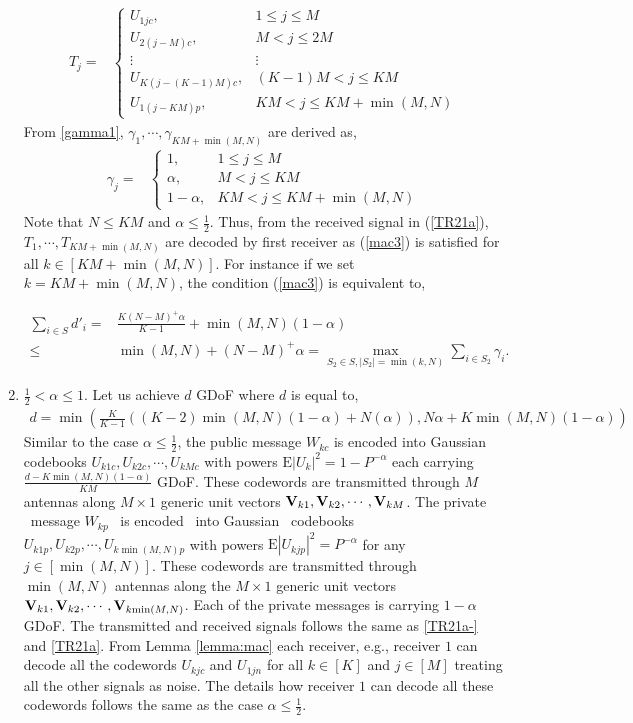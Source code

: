 \documentclass[11pt]{article}
\begin{document}
\begin{enumerate}
\begin {align}
T_j=&\left\{
\begin{array}{ll} 
U_{1jc},&1\le j\le {M}\\ 
U_{2(j-M)c},&M<j\le 2M\\
\vdots &\vdots\\
U_{K(j-(K-1)M)c},&(K-1)M<j\le KM\\
U_{1(j-KM)p},&KM<j\le KM+\min(M,N)
\end{array}
\right.
\end{align}
From \eqref{gamma1}, $\gamma_1,\cdots,\gamma_{KM+\min(M,N)}$ are derived as,
\begin {align}
\gamma_j=&\left\{
\begin{array}{ll} 
1,&1\le j\le M\\ 
\alpha,&M< j\le KM\\ 
1-\alpha,&KM< j\le KM+\min(M,N)
\end{array}
\right.\label{ffd2}
\end{align}
Note that $N\le KM$ and $\alpha\le\frac{1}{2}$. Thus, from the received signal in (\ref{TR21a}), $T_1,\cdots,T_{KM+\min(M,N)}$ are decoded by  first receiver as (\ref{mac3}) is satisfied for all $k\in[KM+\min(M,N)]$. For instance if we set $k=KM+\min(M,N)$, the condition (\ref{mac3}) is equivalent to,

\begin{align}
\sum_{i\in S} d'_i=&\frac{K(N-M)^+\alpha}{K-1}+\min(M,N)(1-\alpha)\nonumber\\
\le&\min(M,N)+(N-M)^+\alpha=\max_{S_2\in S,|S_2|=\min(k,N)}\sum_{i\in S_2} \gamma_i .
\end{align}

\item{$\frac{1}{2}<\alpha\leq1$.} Let us achieve $d$ GDoF where $d$  is equal to,
\begin{align}
d=\min\left(\frac{K}{K-1}\left((K-2)\min(M,N)(1-\alpha)+N(\alpha)\right),N\alpha+K\min(M,N)\left(1-\alpha\right)\right) 
\end{align}
Similar to the case $\alpha\le\frac{1}{2}$, the public message $W_{kc}$ is encoded into Gaussian codebooks $U_{k1c},U_{k2c},\cdots,U_{kMc}$ with powers $\mbox{E}{|U_k|}^2=1-P^{-\alpha}$ each carrying $\frac{d-K\min(M,N)(1-\alpha)}{KM}$ GDoF. These codewords are transmitted through $M$ antennas along  $M\times 1$ generic unit  vectors ${\bf V}_{k1},{\bf V}_{k2},\cdots,{\bf V}_{k{M}}$.  The private ~message $W_{kp}$ ~is encoded~ into Gaussian~ codebooks ~$U_{k1p},U_{k2p},\cdots,U_{k\min(M,N)p}$ with powers $\mbox{E}{|U_{kjp}|}^2=P^{-\alpha}$ for any $j\in[\min(M,N)]$. These codewords are transmitted through $\min(M,N)$ antennas along the $M\times 1$ generic unit  vectors ${\bf V}_{k1},{\bf V}_{k2},\cdots,{\bf V}_{k{\min(M,N)}}$. Each of the  private messages is carrying $1-\alpha$ GDoF. The transmitted and received signals follows the same as \eqref{TR21a-} and \eqref{TR21a}. From Lemma \ref{lemma:mac} each receiver, e.g., receiver $1$ can decode all the codewords $U_{kjc}$ and $U_{1jn}$ for all $k\in[K]$ and $j\in[M]$  treating all the other signals as noise. The details how receiver $1$ can decode all these codewords follows the same as the case $\alpha\le\frac{1}{2}$.


\end{enumerate}
\end{document}
